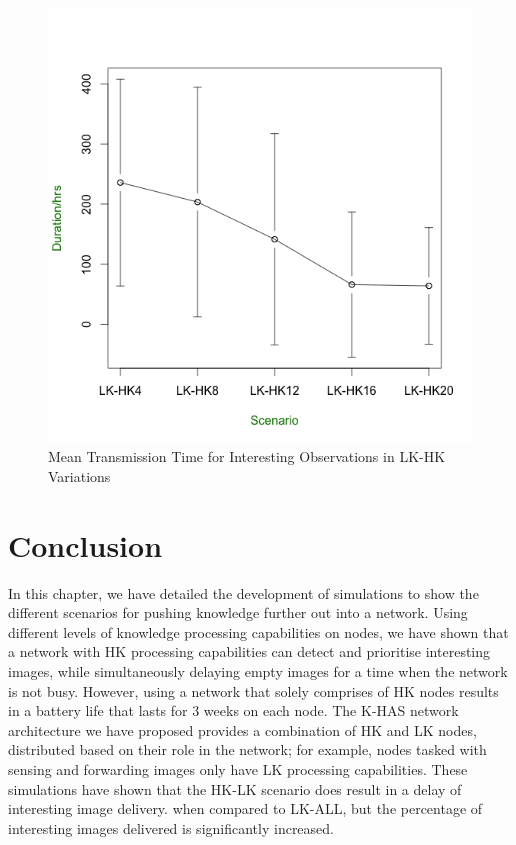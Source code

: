 \begin{figure}[!h]
\centering
\includegraphics[width=\textwidth]{Chap7/figures/khas_int}
\caption{Mean Transmission Time for Interesting Observations in LK-HK Variations}
\label{fig:khas_int}
\end{figure}

\section{Conclusion}
	
In this chapter, we have detailed the development of simulations to show the different scenarios for pushing knowledge further out into a network. Using different levels of knowledge processing capabilities on nodes, we have shown that a network with HK processing capabilities can detect and prioritise interesting images, while simultaneously delaying empty images for a time when the network is not busy. However, using a network that solely comprises of HK nodes results in a battery life that lasts for 3 weeks on each node. The K-HAS network architecture we have proposed provides a combination of HK and LK nodes, distributed based on their role in the network; for example, nodes tasked with sensing and forwarding images only have LK processing capabilities. These simulations have shown that the HK-LK scenario does result in a delay of interesting image delivery. when compared to LK-ALL, but the percentage of interesting images delivered is significantly increased.

